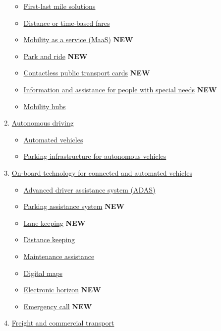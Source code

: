 \documentclass[
]{book}
\providecommand{\tightlist}{%
  \setlength{\itemsep}{0pt}\setlength{\parskip}{0pt}}
\begin{document}
\begin{enumerate}
  \begin{itemize}
  \tightlist
  \item
    \protect\hyperlink{flms}{First-last mile solutions}
  \item
    \protect\hyperlink{dist_time_fares}{Distance or time-based fares}
  \item
    \protect\hyperlink{maas}{Mobility as a service (MaaS)} \textbf{NEW}
  \item
    \protect\hyperlink{p_r}{Park and ride} \textbf{NEW}
  \item
    \protect\hyperlink{contactless_cards}{Contactless public transport cards} \textbf{NEW}
  \item
    \protect\hyperlink{special_needs}{Information and assistance for people with special needs} \textbf{NEW}
  \item
    \protect\hyperlink{mobility_hubs}{Mobility hubs}
  \end{itemize}
\item
  \protect\hyperlink{connected}{Autonomous driving}

  \begin{itemize}
  \tightlist
  \item
    \protect\hyperlink{av}{Automated vehicles}
  \item
    \protect\hyperlink{parking_av}{Parking infrastructure for autonomous vehicles}
  \end{itemize}
\item
  \protect\hyperlink{onboard}{On-board technology for connected and automated vehicles}

  \begin{itemize}
  \tightlist
  \item
    \protect\hyperlink{adas}{Advanced driver assistance system (ADAS)}
  \item
    \protect\hyperlink{parking_assistance}{Parking assistance system} \textbf{NEW}
  \item
    \protect\hyperlink{lane_keeping}{Lane keeping} \textbf{NEW}
  \item
    \protect\hyperlink{distance_keeping}{Distance keeping}
  \item
    \protect\hyperlink{maintenance_assis}{Maintenance assistance}
  \item
    \protect\hyperlink{digital_maps}{Digital maps}
  \item
    \protect\hyperlink{ehorizon}{Electronic horizon} \textbf{NEW}
  \item
    \protect\hyperlink{ecall}{Emergency call} \textbf{NEW}
  \end{itemize}
\item
  \protect\hyperlink{freight}{Freight and commercial transport}


\end{enumerate}
\end{document}
